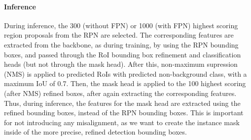 \paragraph{Inference}
During inference, the 300 (without FPN) or 1000 (with FPN) highest scoring region proposals
from the RPN are selected. The corresponding features are extracted from the backbone, as during training, by using the RPN bounding boxes,
and passed through the RoI bounding box refinement and classification heads
(but not through the mask head).
After this, non-maximum supression (NMS) is applied to predicted RoIs with predicted non-background class,
with a maximum IoU of 0.7.
Then, the mask head is applied to the 100 highest scoring (after NMS) refined boxes,
after again extracting the corresponding features.
Thus, during inference, the features for the mask head are extracted using the refined
bounding boxes, instead of the RPN bounding boxes. This is important for not
introducing any misalignment, as we want to create the instance mask inside of the
more precise, refined detection bounding boxes.
